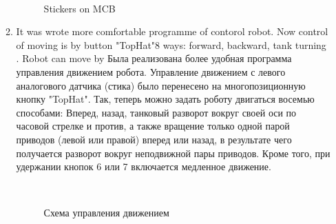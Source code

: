 \begin{enumerate}
\begin{enumerate}
\begin{figure}[H]
\begin{minipage}[h]{0.29\linewidth}
			\end{minipage}
			\hfill
			\begin{minipage}[h]{0.1\linewidth}
				\center  
			\end{minipage}
			\caption{Stickers on MCB}
		\end{figure}
		
        \item It was wrote more comfortable programme of contorol robot. Now control of moving is by button "TopHat"8 ways: forward, backward, tank turning . Robot can move by   Была реализована более удобная программа управления движением робота. Управление движением с левого аналогового датчика (стика) было перенесено на многопозиционную кнопку "TopHat". Так, теперь можно задать роботу двигаться восемью способами: Вперед, назад, танковый разворот вокруг своей оси по часовой стрелке и против, а также вращение только одной парой приводов (левой или правой) вперед или назад, в результате чего получается разворот вокруг неподвижной пары приводов. Кроме того, при удержании кнопок 6 или 7 включается медленное движение.
		
        \begin{figure}[H]
	  	  \begin{minipage}[h]{0.2\linewidth}
	  		\center  
	  	  \end{minipage}
	  	  \begin{minipage}[h]{0.6\linewidth}
	  		\caption{Схема управления движением}
	  	  \end{minipage}
	   \end{figure}
	   

\end{enumerate}
\end{enumerate}

